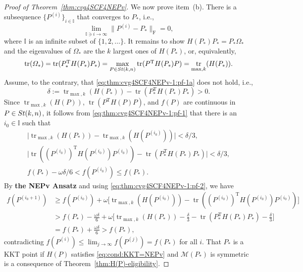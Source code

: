 \documentclass[11pt]{article}
\def\bbI{\mathbb{I}}
\def\scrM{\mathscr{M}}
\newcommand\STM[2]{{\rm St}(#1,#2)}
\DeclareMathOperator{\tr}{tr}
\DeclareMathOperator{\F}{F}
\DeclareMathOperator{\T}{T}
\theoremstyle{definition}
\numberwithin{equation}{section}
\begin{document}
\begin{proof}[Proof of Theorem~\ref{thm:cvg4SCF4NEPv}]
We now prove item~(b). There is a subsequence $\{P^{(i)}\}_{i\in\bbI}$ that converges to $P_*$, i.e.,
\begin{equation}\label{eq:thm:cvg4SCF4NEPv-1:pf-1}
\lim_{\bbI\ni i\to \infty}\|P^{(i)}-P_*\|_{\F}= 0,
\end{equation}
where $\bbI$ is an infinite subset of $\{1,2,\ldots\}$.
It remains to show $H(P_*)P_*=P_*\Omega_*$ and the eigenvalues of $\Omega_*$ are the $k$ largest ones of $H(P_*)$,
or, equivalently,
\begin{equation}\label{eq:thm:cvg4SCF4NEPv-1:pf-1a}
\tr(\Omega_*)=\tr(P_*^{\T}H(P_*)P_*)=\max_{P\in\STM{k}{n}}\tr(P^{\T}H(P_*)P)=\tr_{\max,k}(H(P_*)).
\end{equation}
Assume, to the contrary, that \eqref{eq:thm:cvg4SCF4NEPv-1:pf-1a} does not hold, i.e.,
$$
\delta:=\tr_{\max,k}(H(P_*))-\tr(P_*^{\T}H(P_*)P_*)>0.
$$
Since $\tr_{\max,k}(H(P))$, $\tr(P^{\T}H(P)P)$, and $f(P)$ are continuous in $P\in\STM{k}{n}$, it follows from
\eqref{eq:thm:cvg4SCF4NEPv-1:pf-1} that there is an $i_0\in\bbI$ such that
\begin{subequations}\label{eq:thm:cvg4SCF4NEPv-1:pf-2}
\begin{gather}
\Big|\tr_{\max,k}(H(P_*))-\tr_{\max,k}(H(P^{(i_0)}))\Big| <\delta/3, \label{eq:thm:cvg4SCF4NEPv-1:pf-2a}\\
\Big|\tr((P^{(i_0)})^{\T}H(P^{(i_0)})P^{(i_0)})-\tr(P_*^{\T}H(P_*)P_*)\Big|<\delta/3, \label{eq:thm:cvg4SCF4NEPv-1:pf-2b}\\
f(P_*)-\omega\delta/6<f(P^{(i_0)})\le f(P_*).  \label{eq:thm:cvg4SCF4NEPv-1:pf-2c}
\end{gather}
\end{subequations}
By {\bf the NEPv Ansatz} and using \eqref{eq:thm:cvg4SCF4NEPv-1:pf-2}, we have
\begin{align*}
f(P^{(i_0+1)})&\ge f(P^{(i_0)})+\omega\Big[\tr_{\max,k}(H(P^{(i_0)}))-\tr((P^{(i_0)})^{\T}H(P^{(i_0)})P^{(i_0)})\Big] \\
  &>f(P_*)-\frac {\omega\delta}6+\omega\Big[\tr_{\max,k}(H(P_*))-\frac {\delta}3-\tr(P_*^{\T}H(P_*)P_*)-\frac {\delta}3\Big] \\
  &=f(P_*)+\frac {\omega\delta}6>f(P_*),
\end{align*}
contradicting $f(P^{(i)})\le\lim_{j\to\infty}f(P^{(j)})= f(P_*)$ for all $i$.
That $P_*$ is a KKT point if $H(P)$
        satisfies \eqref{eq:cond:KKT=NEPv} and $\scrM(P_*)$ is symmetric is a consequence of Theorem~\ref{thm:H(P)-eligibility}.


\end{proof}
\end{document}
